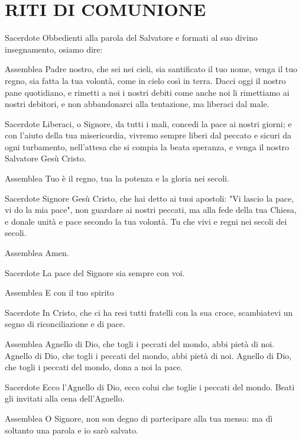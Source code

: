

\section*{RITI DI COMUNIONE}

\begin{dialoghi}
\item[Sacerdote] Obbedienti alla parola del Salvatore e formati al suo divino insegnamento, osiamo dire:
\item[Assemblea] Padre nostro, che sei nei cieli, sia santificato il tuo nome, venga il tuo regno, sia fatta la tua volontà, come in cielo così in terra. Dacci oggi il nostro pane quotidiano, e rimetti a noi i nostri debiti come anche noi li rimettiamo ai nostri debitori, e non abbandonarci alla tentazione, ma liberaci dal male.
\item[Sacerdote] Liberaci, o Signore, da tutti i mali, concedi la pace ai nostri giorni; e con l'aiuto della tua misericordia, vivremo sempre liberi dal peccato e sicuri da ogni turbamento, nell'attesa che si compia la beata speranza, e venga il nostro Salvatore Gesù Cristo.
\item[Assemblea] Tuo è il regno, tua la potenza e la gloria nei secoli.
\item[Sacerdote] Signore Gesù Cristo, che hai detto ai tuoi apostoli: "Vi lascio la pace, vi do la mia pace", non guardare ai nostri peccati, ma alla fede della tua Chiesa, e donale unità e pace secondo la tua volontà. Tu che vivi e regni nei secoli dei secoli.
\item[Assemblea] Amen.
\item[Sacerdote] La pace del Signore sia sempre con voi.
\item[Assemblea] E con il tuo spirito
\item[Sacerdote] In Cristo, che ci ha resi tutti fratelli con la sua croce, scambiatevi un segno di riconciliazione e di pace.

\item[Assemblea] Agnello di Dio, che togli i peccati del mondo, abbi pietà di noi. Agnello di Dio, che togli i peccati del mondo, abbi pietà di noi. Agnello di Dio, che togli i peccati del mondo, dona a noi la pace.
\item[Sacerdote] Ecco l'Agnello di Dio, ecco colui che toglie i peccati del mondo. Beati gli invitati alla cena dell'Agnello.
\item[Assemblea] O Signore, non son degno di partecipare alla tua mensa: ma dì soltanto una parola e io sarò salvato.
\end{dialoghi}

